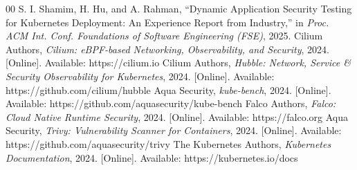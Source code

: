 \documentclass[conference]{IEEEtran}
\begin{document}
\begin{thebibliography}{00}
 S. I. Shamim, H. Hu, and A. Rahman, ``Dynamic Application Security Testing for Kubernetes Deployment: An Experience Report from Industry,'' in \emph{Proc. ACM Int. Conf. Foundations of Software Engineering (FSE)}, 2025.
 Cilium Authors, \emph{Cilium: eBPF-based Networking, Observability, and Security}, 2024. [Online]. Available: https://cilium.io
 Cilium Authors, \emph{Hubble: Network, Service \& Security Observability for Kubernetes}, 2024. [Online]. Available: https://github.com/cilium/hubble
 Aqua Security, \emph{kube-bench}, 2024. [Online]. Available: https://github.com/aquasecurity/kube-bench
 Falco Authors, \emph{Falco: Cloud Native Runtime Security}, 2024. [Online]. Available: https://falco.org
 Aqua Security, \emph{Trivy: Vulnerability Scanner for Containers}, 2024. [Online]. Available: https://github.com/aquasecurity/trivy
 The Kubernetes Authors, \emph{Kubernetes Documentation}, 2024. [Online]. Available: https://kubernetes.io/docs
\end{thebibliography}
\end{document}
